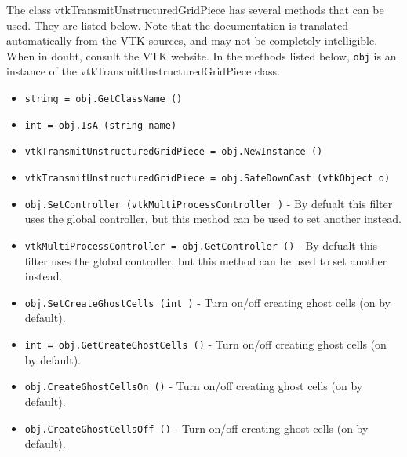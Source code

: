 The class vtkTransmitUnstructuredGridPiece has several methods that can be used.
  They are listed below.
Note that the documentation is translated automatically from the VTK sources,
and may not be completely intelligible.  When in doubt, consult the VTK website.
In the methods listed below, \verb|obj| is an instance of the vtkTransmitUnstructuredGridPiece class.
\begin{itemize}
\item  \verb|string = obj.GetClassName ()|

\item  \verb|int = obj.IsA (string name)|

\item  \verb|vtkTransmitUnstructuredGridPiece = obj.NewInstance ()|

\item  \verb|vtkTransmitUnstructuredGridPiece = obj.SafeDownCast (vtkObject o)|

\item  \verb|obj.SetController (vtkMultiProcessController )| -  By defualt this filter uses the global controller,
 but this method can be used to set another instead.

\item  \verb|vtkMultiProcessController = obj.GetController ()| -  By defualt this filter uses the global controller,
 but this method can be used to set another instead.

\item  \verb|obj.SetCreateGhostCells (int )| -  Turn on/off creating ghost cells (on by default).

\item  \verb|int = obj.GetCreateGhostCells ()| -  Turn on/off creating ghost cells (on by default).

\item  \verb|obj.CreateGhostCellsOn ()| -  Turn on/off creating ghost cells (on by default).

\item  \verb|obj.CreateGhostCellsOff ()| -  Turn on/off creating ghost cells (on by default).

\end{itemize}
